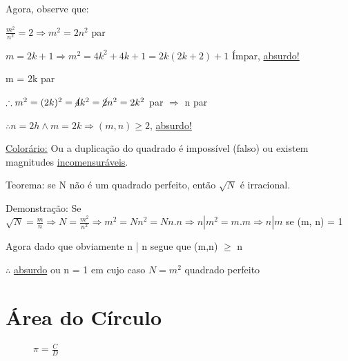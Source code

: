 \documentclass[a4paper, 12pt]{article}
\begin{document}
Agora, observe que:

\begin{center}
$\frac{m^2}{n^2} = 2 \Rightarrow m^2 = 2n^2$ par 
\newline

$m = 2k + 1 \Rightarrow m^2 = 4k^2 + 4k + 1 = 2k(2k + 2) + 1$ Ímpar, \underline{absurdo!}

{m = 2k par}

$\therefore m^2 = (2k)^2 = \cancel{4}k^2 = \cancel{2}n^2 = 2k^2$ par $\Rightarrow$ n par
\newline

$\therefore n = 2h \wedge  m = 2k \Rightarrow (m,n) \ge 2$, \underline{absurdo!}
\newline
\end{center}

\underline{Colorário:} Ou a duplicação do quadrado é impossível (falso) ou existem magnitudes \underline{incomensuráveis}.
\newline

Teorema: se N não é um quadrado perfeito, então $\sqrt{N}$ é irracional.
\newline

Demonstração: Se $\sqrt{N} = \frac{m}{n} \Rightarrow N = \frac{m^2}{n^2} \Rightarrow m^2 = Nn^2 = Nn.n \Rightarrow n | m^2 = m.m \Rightarrow n | m$ se (m, n) = 1 
\newline

Agora dado que obviamente n | n segue que (m,n) $\ge$ n
\newline

$\therefore$ \underline{absurdo} ou n = 1 em cujo caso $N = m^2$ quadrado perfeito

\newpage

\section{Área do Círculo}

\begin{figure} [h!]
    \begin{minipage}[!] {0.4\linewidth}
        \caption{}
    \end{minipage}
    \begin{minipage}[!] {0.4\linewidth}
        $\pi = \frac{C}{D}$
    \end{minipage}
\end{figure}
\end{document}
